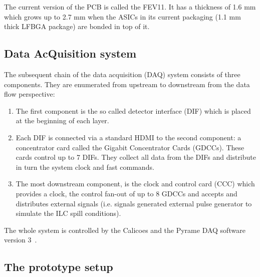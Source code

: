 \documentclass[a4paper,11pt]{article}
\begin{document}
The current version of the PCB is called the FEV11. It has a thickness of 1.6 mm which
grows up to 2.7 mm when the ASICs in its current packaging (1.1 mm thick LFBGA package) are
bonded in top of it.

\subsection{Data AcQuisition system}
\label{sec:DAQ}

The subsequent chain of the data acquisition (DAQ)\cite{Gastaldi:2014vaa} system consists of three components.
They are enumerated from upstream to downstream from the data flow perspective:

\begin{enumerate}
\item The first component is the so called detector interface (DIF) which is placed at the beginning of each layer.
\item Each DIF is connected via a standard HDMI to the  second component: a concentrator card called the Gigabit Concentrator Cards (GDCCs). These cards control up to 7 DIFs. They collect all data from the DIFs and distribute in turn the system clock and fast commands.
  \item The most downstream component, is the clock and control card (CCC) which
provides a clock, the control fan-out of up to 8 GDCCs and accepts and distributes external signals (i.e. signals
generated external pulse generator to simulate the ILC spill conditions).
\end{enumerate}

The whole system is controlled by the Calicoes and the Pyrame DAQ software version 3~\cite{Rubio-Roy:2017ere,Magniette:2018wdz}.

\subsection{The prototype setup}
\label{sec:setup}
\end{document}
